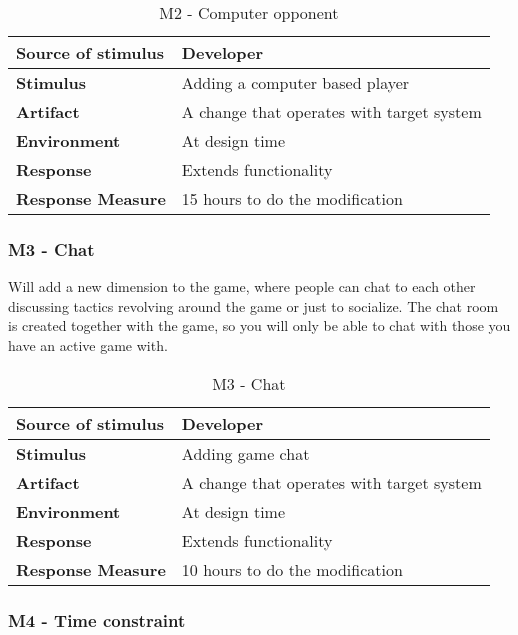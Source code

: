 \begin{table}[h!]
\begin{tabular}{ | p{110pt} | p{250pt}  |}
\hline
\bf Source of stimulus &  Developer  \\ \hline
\bf Stimulus & Adding a computer based player \\ \hline 
\bf Artifact & A change that operates with target system  \\  \hline
\bf Environment & At design time \\ \hline
\bf Response & Extends functionality \\ \hline
\bf Response Measure & 15 hours to do the modification \\ \hline

\end{tabular}
\caption{M2 - Computer opponent}
\end{table}

\subsubsection{M3 - Chat}

Will add a new dimension to the game, where people can chat to each other discussing tactics revolving around the game or just to socialize. The chat room is created together with the game, so you will only be able to chat with those you have an active game with.

\begin{table}[h!]
\begin{tabular}{ | p{110pt} | p{250pt}  |}
\hline
\bf Source of stimulus &  Developer  \\ \hline
\bf Stimulus & Adding game chat \\ \hline 
\bf Artifact & A change that operates with target system  \\  \hline
\bf Environment & At design time \\ \hline
\bf Response & Extends functionality \\ \hline
\bf Response Measure & 10 hours to do the modification \\ \hline

\end{tabular}
\caption{M3 - Chat}
\end{table}

\pagebreak

\subsubsection{M4 - Time constraint}

